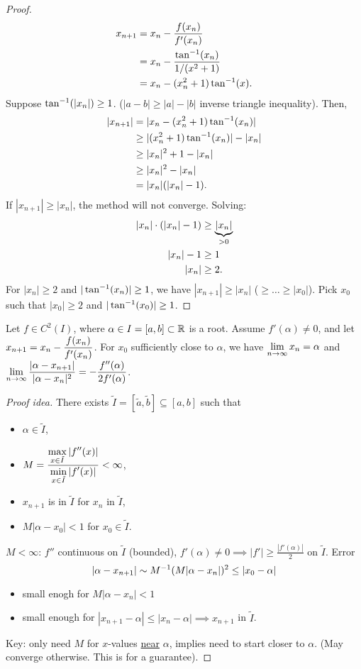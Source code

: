 \documentclass[]{article}
\begin{document}
\begin{proof}
	\begin{align*}
		x_{n+1} &= x_n-\frac{f(x_n)}{f'(x_n)} \\
				&= x_n-\frac{\tan\inv(x_n)}{1/(x^2+1)} \\
				&= x_n-(x_n^2+1)\tan\inv(x).
	\end{align*}
	Suppose $\tan\inv(|x_n|)\geq1$. ($|a-b|\geq|a|-|b|$ inverse triangle inequality). Then,
	\begin{align*}
		|x_{n+1}| &= |x_n-(x_n^2+1)\tan\inv(x_n)| \\
				  &\geq |(x_n^2+1)\tan\inv(x_n)|-|x_n| \\
				  &\geq |x_n|^2+1-|x_n| \\
				  &\geq |x_n|^2-|x_n| \\
				  &= |x_n|(|x_n|-1).
	\end{align*}
	If $|x_{n+1}|\geq |x_n|$, the method will not converge.
	Solving:
	\begin{align*}
		|x_n|\cdot(|x_n|-1) &\geq \ub{>0}{|x_n|} \\
		|x_n|-1 &\geq 1 \\
		|x_n| &\geq2.
	\end{align*}
	For $|x_n|\geq2$ and $|\tan\inv(x_n)|\geq1$, we have $|x_{n+1}|\geq|x_n|$ ($\geq\dots\geq|x_0|$).
	Pick $x_0$ such that $|x_0|\geq2$ and $|\tan\inv(x_0)|\geq1$.
\end{proof}

\begin{theorem}
	Let $f\in C^2(I)$, where $\alpha\in I=[a,b]\subset\mb R$ is a root.
	Assume $f'(\alpha)\neq0$, and let $\ds x_{n+1}=x_n-\frac{f(x_n)}{f'(x_n)}$.
	For $x_0$ sufficiently close to $\alpha$, we have $\ds\lim_{n\ra\infty}x_n=\alpha$ and $\ds\lim_{n\ra\infty} \frac{|\alpha-x_{n+1}|}{|\alpha-x_n|^2} = -\frac{f''(\alpha)}{2f'(\alpha)}$.
\end{theorem}
\begin{proof}
	[Proof idea] There exists $\tilde I=[\tilde a,\tilde b]\subseteq[a,b]$ such that
	\begin{itemize}
		\item $\alpha\in\tilde I$,
		\item $\ds M = \frac{\ds\max_{x\in\tilde I}|f''(x)|}{\ds\min_{x\in\tilde I}|f'(x)|} < \infty$,
		\item $x_{n+1}$ is in $\tilde I$ for $x_n$ in $\tilde I$,
		\item $M|\alpha-x_0|<1$ for $x_0\in\tilde I$.
	\end{itemize}
	$M<\infty$: $f''$ continuous on $\tilde I$ (bounded), $f'(\alpha)\neq0\implies |f'|\geq \frac{|f'(\alpha)|}2$ on $\tilde I$.
	Error $$|\alpha-x_{n+1}|\sim M\inv(M|\alpha-x_n|)^2 \leq |x_0-\alpha|$$
	\begin{itemize}
		\item small enogh for $M|\alpha-x_n|<1$
		\item small enough for $|x_{n+1}-\alpha|\leq|x_n-\alpha| \implies x_{n+1}$ in $\tilde I$.
	\end{itemize}
	Key: only need $M$ for $x$-values \ul{near} $\alpha$, implies need to start closer to $\alpha$. (May converge otherwise. This is for a guarantee).
\end{proof}
\end{document}
